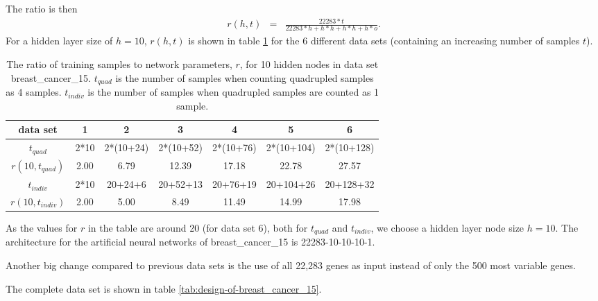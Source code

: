 The ratio is then 
\begin{eqnarray*}
r(h,t) & = & \frac{22283*t}{22283*h+h*h+h*h+h*o}.
\end{eqnarray*}
For a hidden layer size of $h=10$, $r(h,t)$ is shown in table \ref{tab:breast_cancer_12-number-r}
for the 6 different data sets (containing an increasing number of
samples $t$).
\begin{table}
\begin{centering}
\begin{tabular}{|c||c|c|c|c|c|c|}
\hline 
data set & 1 & 2 & 3 & 4 & 5 & 6\tabularnewline
\hline 
\hline 
$t_{quad}$ & 2{*}10 & 2{*}(10+24) & 2{*}(10+52) & 2{*}(10+76) & 2{*}(10+104) & 2{*}(10+128)\tabularnewline
\hline 
$r(10,t_{quad})$ & 2.00 & 6.79 & 12.39 & 17.18 & 22.78 & 27.57\tabularnewline
\hline 
$t_{indiv}$ & 2{*}10 & 20+24+6 & 20+52+13 & 20+76+19 & 20+104+26 & 20+128+32\tabularnewline
\hline 
$r(10,t_{indiv})$ & 2.00 & 5.00 & 8.49 & 11.49 & 14.99 & 17.98\tabularnewline
\hline 
\end{tabular}
\par\end{centering}
\caption[The ratio of training samples to network parameters for 10 hidden
nodes.]{\label{tab:breast_cancer_12-number-r}The ratio of training samples
to network parameters, $r$,  for 10 hidden nodes in data set breast\_cancer\_15.
$t_{quad}$ is the number of samples when counting quadrupled samples
as 4 samples. $t_{indiv}$ is the number of samples when quadrupled
samples are counted as 1 sample.}
\end{table}
As the values for $r$ in the table are around 20 (for data set 6),
both for $t_{quad}$ and $t_{indiv}$, we choose a hidden layer node
size $h=10$. The architecture for the artificial neural networks
of breast\_cancer\_15 is 22283-10-10-10-1.

Another big change compared to previous data sets is the use of all
22,283 genes as input instead of only the 500 most variable genes.

The complete data set is shown in table \ref{tab:design-of-breast_cancer_15}.

